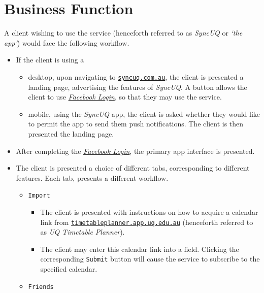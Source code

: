 \documentclass[8pt,a4paper]{report}
\begin{document}
\section{Business Function}

A client wishing to use the service (henceforth referred to as \textit{SyncUQ} or \textit{`the app'}) would face the following workflow.

\begin{itemize}
    \item If the client is using a 
        \begin{itemize} 
            \item desktop, upon navigating to \href{http://www.syncuq.com.au/}{\texttt{syncuq.com.au}}, the client is presented a landing page, advertising the features of \textit{SyncUQ}. A button allows the client to use \href{https://developers.facebook.com/docs/facebook-login}{\textit{Facebook Login}}, so that they may use the service.
            \item mobile, using the \textit{SyncUQ} app, the client is asked whether they would like to permit the app to send them push notifications. The client is then presented the landing page.
        \end{itemize}
    \item After completing the \href{https://developers.facebook.com/docs/facebook-login}{\textit{Facebook Login}}, the primary app interface is presented.
    \item The client is presented a choice of different tabs, corresponding to different features. Each tab, presents a different workflow.
        \begin{itemize}
            \item \texttt{Import}
                \begin{itemize}
                    \item The client is presented with instructions on how to acquire a calendar link from \href{http://timetableplanner.app.uq.edu.au/}{\texttt{timetableplanner.app.uq.edu.au}} (henceforth referred to as \textit{UQ Timetable Planner}).
                    \item The client may enter this calendar link into a field. Clicking the corresponding \texttt{Submit} button will cause the service to subscribe to the specified calendar.
                \end{itemize}
            \item \texttt{Friends}

\end{itemize}
\end{itemize}
\end{document}

